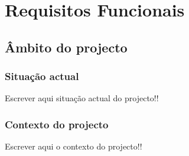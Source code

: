\chapter{Requisitos Funcionais}

\section{Âmbito do projecto}

\subsection{Situação actual}

Escrever aqui situação actual do projecto!!

\subsection{Contexto do projecto}

Escrever aqui o contexto do projecto!!

